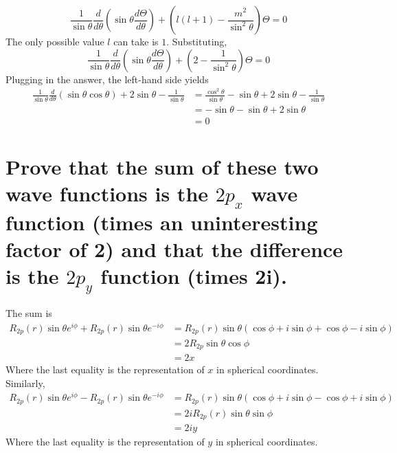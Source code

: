 \documentclass[answers]{exam}
\begin{document}
\begin{questions}
\begin{parts}
	\begin{solution}
		$$\frac{1}{\sin\theta}\frac{d}{d\theta}\left(\sin\theta\frac{d\Theta}{d\theta}\right) + \left(l(l+1) - \frac{m^2}{\sin^2\theta}\right)\Theta = 0$$
		The only possible value $l$ can take is $1$. Substituting,
		$$\frac{1}{\sin\theta}\frac{d}{d\theta}\left(\sin\theta\frac{d\Theta}{d\theta}\right) + \left(2 - \frac{1}{\sin^2\theta}\right)\Theta = 0$$
		Plugging in the answer, the left-hand side yields
		\begin{align*}
			\frac{1}{\sin\theta}\frac{d}{d\theta}(\sin\theta\cos\theta) + 2\sin\theta - \frac{1}{\sin\theta} &= \frac{\cos^2\theta}{\sin\theta} - \sin\theta + 2\sin\theta - \frac{1}{\sin\theta} \\
															 &= -\sin\theta - \sin\theta + 2\sin\theta \\
															 &= 0
		\end{align*}
	\end{solution}

	\part{Prove that the sum of these two wave functions is the $2p_x$ wave function (times an uninteresting factor of 2) and that the difference is the $2p_y$ function (times 2i).}

	\begin{solution}
		The sum is
		\begin{align*}
			R_{2p}(r)\sin\theta e^{i\phi} + R_{2p}(r)\sin\theta e^{-i\phi} &= R_{2p}(r)\sin\theta(\cos\phi + i\sin\phi + \cos\phi - i\sin\phi) \\
										       &= 2R_{2p}\sin\theta\cos\phi \\
										       &= 2x
		\end{align*}
		Where the last equality is the representation of $x$ in spherical coordinates. Similarly,
		\begin{align*}
			R_{2p}(r)\sin\theta e^{i\phi} - R_{2p}(r)\sin\theta e^{-i\phi} &= R_{2p}(r)\sin\theta(\cos\phi + i\sin\phi - \cos\phi + i\sin\phi) \\
										       &= 2iR_{2p}(r)\sin\theta\sin\phi \\
										       &= 2iy
		\end{align*}
		Where the last equality is the representation of $y$ in spherical coordinates.
	\end{solution}
\end{parts}


\end{questions}
\end{document}

